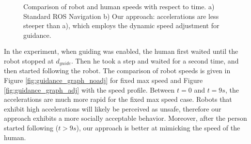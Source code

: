 \documentclass[12pt]{gatech-thesis}
\begin{document}
\begin{figure}[ht!]
\centering
%
        
    \caption{%
	Comparison of robot and human speeds with respect to time. a) Standard ROS Navigation b) Our approach: accelerations are less steeper than a), which employs the dynamic speed adjustment for guidance.
     }%
   \label{fig:guidance_performance_graph}
\end{figure}

In the experiment, when guiding was enabled, the human first waited until the robot stopped at $d_{guide}$. Then he took a step and waited for a second time, and then started following the robot. The comparison of robot speeds is given in Figure \ref{fig:guidance_graph_noadj} for fixed max speed and Figure \ref{fig:guidance_graph_adj} with the speed profile. Between $t=0$ and $t=9s$, the accelerations are much more rapid for the fixed max speed case. Robots that exhibit high accelerations will likely be perceived as unsafe, therefore our approach exhibits a more socially acceptable behavior. Moreover, after the person started following ($t >9s$), our approach is better at mimicking the speed of the human.
\end{document}

